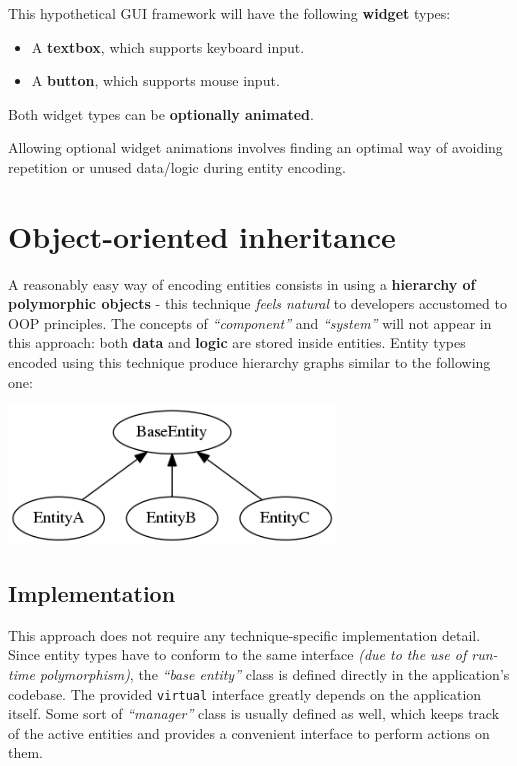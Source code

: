 \documentclass[twoside, 12pt, a4paper, openany]{book}
\let\origfigure=\figure
\let\endorigfigure=\endfigure
\renewenvironment{figure}[1][]{%
\origfigure[H]
}{%
\endorigfigure
}
\begin{document}
This hypothetical GUI framework will have the following \textbf{widget}
types:

\begin{itemize}
\item
  A \textbf{textbox}, which supports keyboard input.
\item
  A \textbf{button}, which supports mouse input.
\end{itemize}

Both widget types can be \textbf{optionally animated}.

Allowing optional widget animations involves finding an optimal way of
avoiding repetition or unused data/logic during entity encoding.

\section{Object-oriented inheritance}\label{object-oriented-inheritance}

A reasonably easy way of encoding entities consists in using a
\textbf{hierarchy of polymorphic objects} - this technique \emph{feels
natural} to developers accustomed to OOP principles. The concepts of
\emph{``component''} and \emph{``system''} will not appear in this
approach: both \textbf{data} and \textbf{logic} are stored inside
entities. Entity types encoded using this technique produce hierarchy
graphs similar to the following one:

\begin{figure}[htbp]
\centering
\includegraphics[width=0.65000\textwidth]{source/figures/generated/ecs/overview/oop/example_hierarchy_0.png}
\caption{Object-oriented inheritance: hypothetical entity hierarchy}
\end{figure}

\subsection{Implementation}\label{implementation}

This approach does not require any technique-specific implementation
detail. Since entity types have to conform to the same interface
\emph{(due to the use of run-time polymorphism)}, the \emph{``base
entity''} class is defined directly in the application's codebase. The
provided
\texttt{virtual}
interface greatly depends on the application itself. Some sort of
\emph{``manager''} class is usually defined as well, which keeps track
of the active entities and provides a convenient interface to perform
actions on them.
\end{document}

